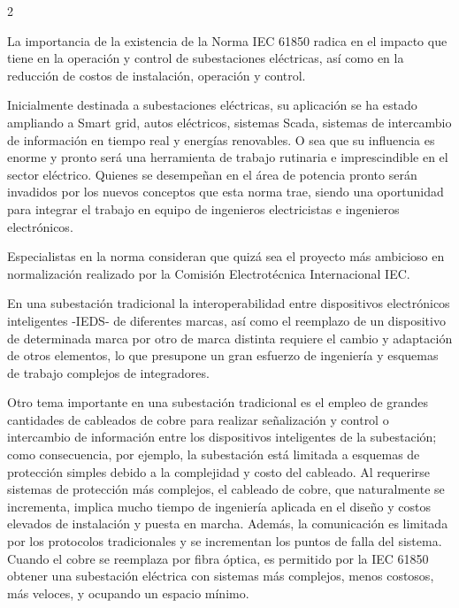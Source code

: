 \documentclass[12pt,spanish,Letterpaper,openany]{book}
\begin{document}
\begin {multicols}{2}

La importancia de la existencia de la Norma IEC 61850 radica en el impacto que tiene en la operación y control de subestaciones eléctricas, así como en la reducción de costos de instalación, operación y control.

Inicialmente destinada a subestaciones eléctricas, su aplicación se ha estado ampliando a Smart grid, autos eléctricos, sistemas Scada, sistemas de intercambio de información en tiempo real y energías renovables. O sea que su influencia es enorme y pronto será una herramienta de trabajo rutinaria e imprescindible en el sector eléctrico. Quienes se desempeñan en el área de potencia pronto serán invadidos por los nuevos conceptos que esta norma trae, siendo una oportunidad para integrar el trabajo en equipo de ingenieros electricistas e ingenieros electrónicos.

Especialistas en la norma consideran que quizá sea el proyecto más ambicioso en normalización realizado por la Comisión Electrotécnica Internacional IEC.

En una subestación tradicional la interoperabilidad entre dispositivos electrónicos inteligentes -IEDS- de diferentes marcas, así como el reemplazo de un dispositivo de determinada marca por otro de marca distinta requiere el cambio y adaptación de otros elementos, lo que presupone un gran esfuerzo de ingeniería y esquemas de trabajo complejos de integradores.

Otro tema importante en una subestación tradicional es el empleo de grandes cantidades de cableados de cobre para realizar señalización y control o intercambio de información entre los dispositivos inteligentes de la subestación; como consecuencia, por ejemplo, la subestación está limitada a esquemas de protección simples debido a la complejidad y costo del cableado. Al requerirse sistemas de protección más complejos, el cableado de cobre, que naturalmente se incrementa, implica mucho tiempo de ingeniería aplicada en el diseño y costos elevados de instalación y puesta en marcha. Además, la comunicación es limitada por los protocolos tradicionales y se incrementan los puntos de falla del sistema. Cuando el cobre se reemplaza por fibra óptica, es permitido por la IEC 61850 obtener una subestación eléctrica con sistemas más complejos, menos costosos, más veloces, y ocupando un espacio mínimo.


\end{multicols}
\end{document}
